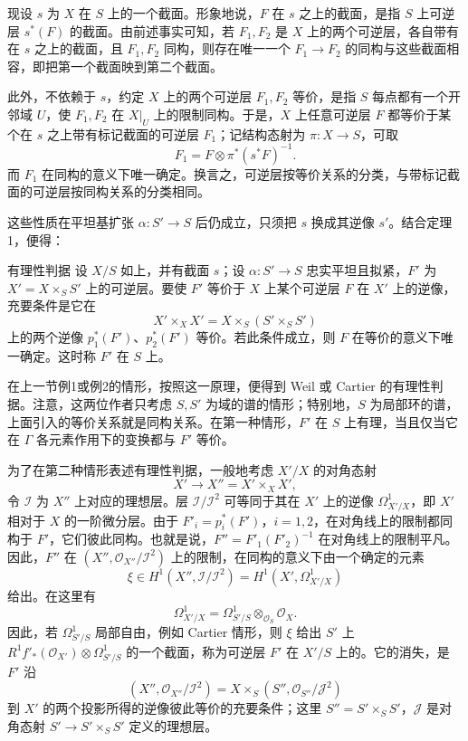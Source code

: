 现设 $s$ 为 $X$ 在 $S$ 上的一个截面。形象地说，$F$ 在 $s$ 之上的截面，是指 $S$ 上可逆层 $s^*(F)$ 的截面。由前述事实可知，若 $F_1,F_2$ 是 $X$ 上的两个可逆层，各自带有在 $s$ 之上的截面，且 $F_1,F_2$ 同构，则存在唯一一个 $F_1\to F_2$ 的同构与这些截面相容，即把第一个截面映到第二个截面。

此外，不依赖于 $s$，约定 $X$ 上的两个可逆层 $F_1,F_2$ 等价，是指 $S$ 每点都有一个开邻域 $U$，使 $F_1,F_2$ 在 $X|_U$ 上的限制同构。于是，$X$ 上任意可逆层 $F$ 都等价于某个在 $s$ 之上带有标记截面的可逆层 $F_1$；记结构态射为 $\pi:X\to S$，可取
\[
F_1=F\otimes\pi^*(s^*F)^{-1}.
\]
而 $F_1$ 在同构的意义下唯一确定。换言之，可逆层按等价关系的分类，与带标记截面的可逆层按同构关系的分类相同。

这些性质在平坦基扩张 $\alpha:S'\to S$ 后仍成立，只须把 $s$ 换成其逆像 $s'$。结合定理1，便得：
\begin{statement}{有理性判据}
设 $X/S$ 如上，并有截面 $s$；设 $\alpha:S'\to S$ 忠实平坦且拟紧，$F'$ 为 $X'=X\times_SS'$ 上的可逆层。要使 $F'$ 等价于 $X$ 上某个可逆层 $F$ 在 $X'$ 上的逆像，充要条件是它在
\[
X'\times_XX'=X\times_S(S'\times_SS')
\]
上的两个逆像 $p_1^*(F')$、$p_2^*(F')$ 等价。若此条件成立，则 $F$ 在等价的意义下唯一确定。这时称 $F'$ 在 $S$ 上。
\end{statement}
在上一节例1或例2的情形，按照这一原理，便得到 Weil 或 Cartier 的有理性判据。注意，这两位作者只考虑 $S,S'$
为域的谱的情形；特别地，$S$ 为局部环的谱，上面引入的等价关系就是同构关系。在第一种情形，$F'$ 在 $S$ 上有理，当且仅当它在 $\Gamma$ 各元素作用下的变换都与 $F'$ 等价。

为了在第二种情形表述有理性判据，一般地考虑 $X'/X$ 的对角态射
\[
X'\longrightarrow X''=X'\times_XX',
\]
令 $\mathcal I$ 为 $X''$ 上对应的理想层。层 $\mathcal I/\mathcal I^2$ 可等同于其在 $X'$ 上的逆像 $\Omega^1_{X'/X}$，即 $X'$ 相对于 $X$ 的一阶微分层。由于 $F'_i=p_i^*(F')$，$i=1,2$，在对角线上的限制都同构于 $F'$，它们彼此同构。也就是说，$F''=F'_1(F'_2)^{-1}$ 在对角线上的限制平凡。因此，$F''$ 在 $(X'',\mathcal O_{X''}/\mathcal I^2)$ 上的限制，在同构的意义下由一个确定的元素
\[
\xi\in H^1(X'',\mathcal I/\mathcal I^2)
=H^1(X',\Omega^1_{X'/X})
\]
给出。在这里有
\[
\Omega^1_{X'/X}=\Omega^1_{S'/S}\otimes_{\mathcal O_S}\mathcal O_X.
\]
因此，若 $\Omega^1_{S'/S}$ 局部自由，例如 Cartier 情形，则 $\xi$ 给出 $S'$ 上 $R^1f'_*(\mathcal O_{X'})\otimes\Omega^1_{S'/S}$ 的一个截面，称为可逆层 $F'$ 在 $X'/S$ 上的。它的消失，是 $F'$ 沿
\[
(X'',\mathcal O_{X''}/\mathcal I^2)
=X\times_S(S'',\mathcal O_{S''}/\mathcal J^2)
\]
到 $X'$ 的两个投影所得的逆像彼此等价的充要条件；这里 $S''=S'\times_SS'$，$\mathcal J$ 是对角态射 $S'\to S'\times_SS'$ 定义的理想层。

